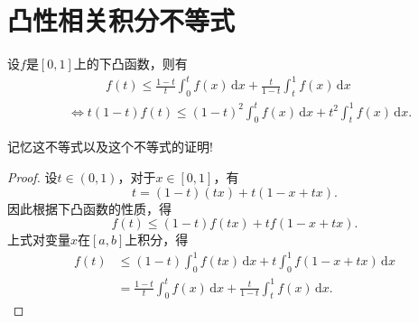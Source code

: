 \documentclass[../../main.tex]{subfiles}
\begin{document}
\section{凸性相关积分不等式}

\begin{proposition}\label{proposition:凸性积分不等式}
设\( f \)是\([0,1]\)上的下凸函数，则有
\begin{align*}
&\qquad \quad  f(t) \leqslant \frac{1-t}{t} \int_0^t f(x)\,\text{d}x + \frac{t}{1-t}\int_t^1 f(x)\,\text{d}x
\\
&\iff t(1 - t)f(t) \leqslant (1 - t)^2 \int_{0}^{t} f(x) \, \mathrm{d}x + t^2 \int_{t}^{1} f(x) \, \mathrm{d}x.
\end{align*}
\end{proposition}
\begin{note}
记忆这不等式以及这个不等式的证明!
\end{note}
\begin{proof}
设\( t \in (0,1) \)，对于\( x \in [0,1] \)，有
\[
t = (1-t)(tx) + t(1 - x + tx).
\]
因此根据下凸函数的性质，得
\[
f(t) \leqslant (1-t)f(tx) + tf(1 - x + tx).
\]
上式对变量\( x \)在\([a,b]\)上积分，得
\begin{align*}
f(t) &\leqslant (1-t)\int_0^1 f(tx)\,\text{d}x + t\int_0^1 f(1 - x + tx)\,\text{d}x \\
&= \frac{1-t}{t}\int_0^t{f(x)\,\mathrm{d}x}+\frac{t}{1-t}\int_t^1{f(x)\,\mathrm{d}x}.
\end{align*}

\end{proof}
\end{document}
